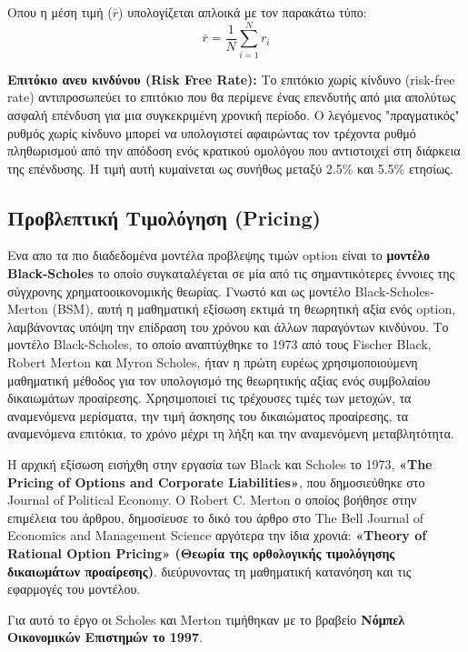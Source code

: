 Οπου η μέση τιμή ($\bar{r}$) υπολογίζεται απλοικά με τον παρακάτω τύπο:
\begin{equation}
    \bar{r} = \frac{1}{N} \sum_{i=1}^{N} r_i
\end{equation}

\textbf{Eπιτόκιο ανευ κινδύνου (Risk Free Rate):}
Το επιτόκιο χωρίς κίνδυνο (risk-free rate) αντιπροσωπεύει το επιτόκιο που θα περίμενε ένας επενδυτής από μια απολύτως ασφαλή επένδυση για μια συγκεκριμένη χρονική περίοδο.
Ο λεγόμενος "πραγματικός" ρυθμός χωρίς κίνδυνο μπορεί να υπολογιστεί αφαιρώντας τον τρέχοντα ρυθμό πληθωρισμού από την απόδοση ενός κρατικού ομολόγου που αντιστοιχεί στη διάρκεια της επένδυσης.
Η τιμή αυτή κυμαίνεται ως συνήθως μεταξύ 2.5\% και 5.5\% ετησίως.

\subsection{Προβλεπτική Τιμολόγηση (Pricing)}
Ενα απο τα πιο διαδεδομένα μοντέλα προβλεψης τιμών option είναι το \textbf{μοντέλο Black-Scholes} το οποίο συγκαταλέγεται σε μία από τις σημαντικότερες έννοιες της σύγχρονης χρηματοοικονομικής θεωρίας.
Γνωστό και ως μοντέλο Black-Scholes-Merton (BSM), αυτή η μαθηματική εξίσωση εκτιμά τη θεωρητική αξία ενός option, λαμβάνοντας υπόψη την επίδραση του χρόνου και άλλων παραγόντων κινδύνου.
Το μοντέλο Black-Scholes, το οποίο αναπτύχθηκε το 1973 από τους Fischer Black, Robert Merton και Myron Scholes, 
ήταν η πρώτη ευρέως χρησιμοποιούμενη μαθηματική μέθοδος για τον υπολογισμό της θεωρητικής αξίας ενός συμβολαίου δικαιωμάτων προαίρεσης.
Χρησιμοποιεί τις τρέχουσες τιμές των μετοχών, τα αναμενόμενα μερίσματα, την τιμή άσκησης του δικαιώματος προαίρεσης, τα αναμενόμενα επιτόκια, το χρόνο μέχρι τη λήξη και την αναμενόμενη μεταβλητότητα.

Η αρχική εξίσωση εισήχθη στην εργασία των Black και Scholes το 1973, \textbf{«The Pricing of Options and Corporate Liabilities»}, που δημοσιεύθηκε στο Journal of Political Economy.
Ο Robert C. Merton ο οποίος βοήθησε στην επιμέλεια του άρθρου, δημοσίευσε το δικό του άρθρο στο The Bell Journal of Economics and Management Science αργότερα την ίδια χρονιά:
\textbf{«Theory of Rational Option Pricing» (Θεωρία της ορθολογικής τιμολόγησης δικαιωμάτων προαίρεσης)}.
διεύρυνοντας τη μαθηματική κατανόηση και τις εφαρμογές του μοντέλου.

Για αυτό το έργο οι Scholes και Merton τιμήθηκαν με το βραβείο \textbf{Νόμπελ Οικονομικών Επιστημών το 1997}.

